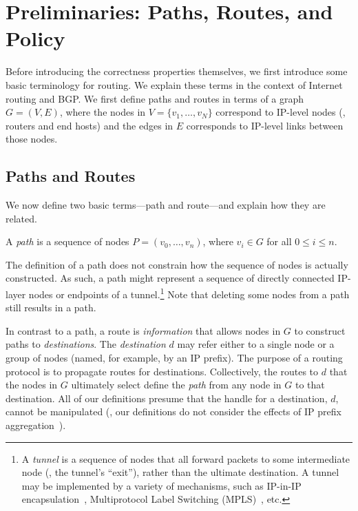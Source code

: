 \section{Preliminaries: Paths, Routes, and Policy}\label{sec:definitions}

Before introducing the correctness properties themselves, we first
introduce some basic terminology for routing.  We explain these terms in
the context of Internet routing and BGP.  We first define paths and
routes in terms of a graph $G = (V,E)$, where the nodes in $V = \{v_1,
\ldots, v_N\}$ correspond to IP-level nodes (\ie, routers and end hosts)
and the edges in $E$ corresponds to IP-level links between those nodes.

\subsection{Paths and Routes}

We now define two basic terms---path and route---and explain how they
are related.

\begin{defn}[Path]\label{defn:rl:path}
A {\em path} is a sequence of nodes $P = (v_0, \ldots, v_n)$, where $v_i
\in G$ for all $0 \leq i \leq n$.
\end{defn}

\noindent
The definition of a path does not constrain how the sequence of nodes is
actually constructed.  As such, a path might represent a sequence of
directly connected IP-layer nodes or endpoints of a tunnel.\footnote{A
{\em tunnel} is a sequence of nodes that all forward packets to some
intermediate node (\ie, the tunnel's ``exit''), rather than the
ultimate destination.  A tunnel may be implemented by a variety of
mechanisms, such as IP-in-IP encapsulation~\cite{rfc2784}, Multiprotocol
Label Switching (MPLS)~\cite{davie:mplsbook,mpls-wg}, etc.}
Note that 
deleting some nodes from a path still results in a path.  

In contrast to a path, a route is {\em information} that allows nodes in
$G$ to construct paths to {\em destinations}.  The {\em destination} $d$
may refer either to a single node or a group of nodes (named, for
example, by an IP prefix).  The purpose of a routing protocol is to
propagate routes for destinations.  Collectively, the routes to $d$ that
the nodes in $G$ ultimately select define the {\em path} from any node
in $G$ to that destination.  All of our definitions presume that the
handle for a destination, $d$, cannot be manipulated (\eg, our
definitions do not consider the effects of IP prefix
aggregation~\cite{rfc1519,rfc1518}). 

